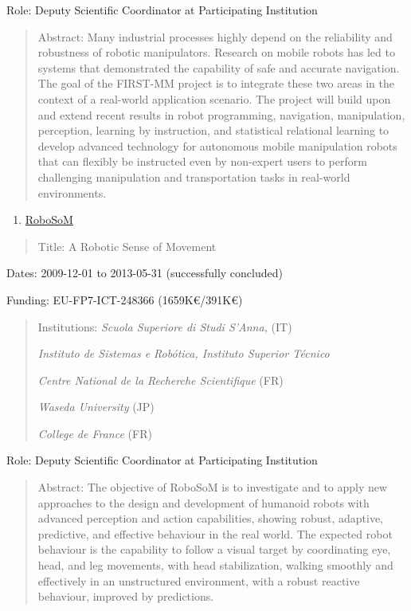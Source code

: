 Role: Deputy Scientific Coordinator at Participating Institution

\begin{quote}
Abstract: Many industrial processes highly depend on the reliability and
robustness of robotic manipulators. Research on mobile robots has led to
systems that demonstrated the capability of safe and accurate
navigation. The goal of the FIRST-MM project is to integrate these two
areas in the context of a real-world application scenario. The project
will build upon and extend recent results in robot programming,
navigation, manipulation, perception, learning by instruction, and
statistical relational learning to develop advanced technology for
autonomous mobile manipulation robots that can flexibly be instructed
even by non-expert users to perform challenging manipulation and
transportation tasks in real-world environments.
\end{quote}

\begin{enumerate}
\def\labelenumi{\arabic{enumi}.}
\setcounter{enumi}{10}
\item
  \ul{RoboSoM}
\end{enumerate}

\begin{quote}
Title: A Robotic Sense of Movement
\end{quote}

Dates: 2009-12-01 to 2013-05-31 (successfully concluded)

Funding: EU-FP7-ICT-248366 (1659K€/391K€)

\begin{quote}
Institutions: \emph{Scuola Superiore di Studi S'Anna,} (IT)

\emph{Instituto de Sistemas e Robótica, Instituto Superior Técnico}

\emph{Centre National de la Recherche Scientifique} (FR)

\emph{Waseda University} (JP)

\emph{College de France} (FR)
\end{quote}

Role: Deputy Scientific Coordinator at Participating Institution

\begin{quote}
Abstract: The objective of RoboSoM is to investigate and to apply new
approaches to the design and development of humanoid robots with
advanced perception and action capabilities, showing robust, adaptive,
predictive, and effective behaviour in the real world. The expected
robot behaviour is the capability to follow a visual target by
coordinating eye, head, and leg movements, with head stabilization,
walking smoothly and effectively in an unstructured environment, with a
robust reactive behaviour, improved by predictions.
\end{quote}

